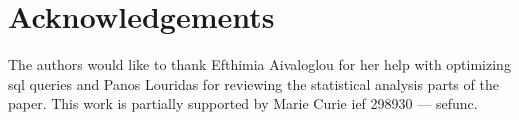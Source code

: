 \documentclass{sig-alternate}
\begin{document}
\section*{Acknowledgements}

The authors would like to thank Efthimia Aivaloglou for her help with 
optimizing {\sc sql} queries and Panos Louridas for reviewing the 
statistical analysis parts of the paper.
This work is partially supported by Marie Curie {\sc ief} 298930 --- {\sc sefunc}.


\balance
\begin{small}

\end{small}
\end{document}
